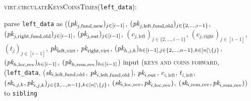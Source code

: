 \begin{center}
  \begin{processbox}{\textsc{virt}.\textsc{circulateKeysCoinsTimes}(\texttt{left\_data}):}
    \begin{algorithmic}[1]
       
        \State parse \texttt{left\_data} as ($(\textit{pk}_{j, \mathrm{fund},
        \mathrm{new}})_{j \in [i-1]}$, $(\textit{pk}_{j, \mathrm{left}, \mathrm{fund},
        \mathrm{old}})_{j \in \{2, \dots, i-1\}}$, $(\textit{pk}_{j, \mathrm{right},
        \mathrm{fund}, \mathrm{old}})_{j \in [i-1]}$, $(\textit{pk}_{j, \mathrm{out}})_{j
        \in [i-1]}$, $(c_{j, \mathrm{left}})_{j \in \{2, \dots, i-1\}}$, $(c_{j,
        \mathrm{right}})_{j \in [i-1]}$, $(t_j)_{j \in [i-1]}$,
        $\textit{pk}_{\mathrm{left}, \mathrm{virt}}$, $\textit{pk}_{\mathrm{right},
        \mathrm{virt}}$, $(\textit{pk}_{h, j, k})_{h \in [i-1], j \in \{2, \dots, n-1\},
        k \in [n] \setminus \{j\}}$, $(\textit{pk}_{h, \mathrm{loc}, \mathrm{rev}})_{h
        \in [i-1]}$, $(\textit{pk}_{h, \mathrm{rem}, \mathrm{rev}})_{h \in [i-1]}$)
         
          \State input (\textsc{keys and coins forward}, (\texttt{left\_data},
          ($\textit{sk}_{i, \mathrm{left}, \mathrm{fund}, \mathrm{old}}$, $\textit{pk}_{i,
          \mathrm{left}, \mathrm{fund}, \mathrm{old}}$), $\textit{pk}_{i, \mathrm{out}}$,
          $c_{i, \mathrm{left}}$, $t_{i, \mathrm{left}}$, $(\textit{sk}_{i, j, k}, \textit{pk}_{i,
          j, k})_{j \in \{2, \dots, n-1\}, k \in [n] \setminus \{j\}}$,
          $(\textit{sk}_{i, \mathrm{loc}, \mathrm{rev}}, \textit{pk}_{i, \mathrm{loc},
          \mathrm{rev}})$, $(\textit{sk}_{i, \mathrm{rem}, \mathrm{rev}}, \textit{pk}_{i,
          \mathrm{rem}, \mathrm{rev}})$) to \texttt{sibling}
          \State {}
\end{algorithmic}
\end{processbox}
\end{center}
